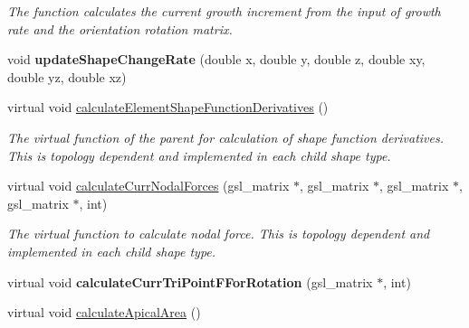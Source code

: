 \begin{DoxyCompactItemize}
\begin{DoxyCompactList}\small\item\em The function calculates the current growth increment from the input of growth rate and the orientation rotation matrix. \end{DoxyCompactList}\item 
\hypertarget{classShapeBase_a227d409b04d95e3110db851a9cb3ed8c}{}void {\bfseries update\+Shape\+Change\+Rate} (double x, double y, double z, double xy, double yz, double xz)\label{classShapeBase_a227d409b04d95e3110db851a9cb3ed8c}

\item 
\hypertarget{classShapeBase_ab86b6c4eef2ea6232dd1d0c300ae5602}{}virtual void \hyperlink{classShapeBase_ab86b6c4eef2ea6232dd1d0c300ae5602}{calculate\+Element\+Shape\+Function\+Derivatives} ()\label{classShapeBase_ab86b6c4eef2ea6232dd1d0c300ae5602}

\begin{DoxyCompactList}\small\item\em The virtual function of the parent for calculation of shape function derivatives. This is topology dependent and implemented in each child shape type. \end{DoxyCompactList}\item 
\hypertarget{classShapeBase_acca6ea9484bbc995d941f1a7bb25e1db}{}virtual void \hyperlink{classShapeBase_acca6ea9484bbc995d941f1a7bb25e1db}{calculate\+Curr\+Nodal\+Forces} (gsl\+\_\+matrix $\ast$, gsl\+\_\+matrix $\ast$, gsl\+\_\+matrix $\ast$, gsl\+\_\+matrix $\ast$, int)\label{classShapeBase_acca6ea9484bbc995d941f1a7bb25e1db}

\begin{DoxyCompactList}\small\item\em The virtual function to calculate nodal force. This is topology dependent and implemented in each child shape type. \end{DoxyCompactList}\item 
\hypertarget{classShapeBase_a9c1dc3dcba4b76026ce83fb7b78c0831}{}virtual void {\bfseries calculate\+Curr\+Tri\+Point\+F\+For\+Rotation} (gsl\+\_\+matrix $\ast$, int)\label{classShapeBase_a9c1dc3dcba4b76026ce83fb7b78c0831}

\item 
\hypertarget{classShapeBase_a010092ac7af5667facbbb8fb6bd98976}{}virtual void \hyperlink{classShapeBase_a010092ac7af5667facbbb8fb6bd98976}{calculate\+Apical\+Area} ()\label{classShapeBase_a010092ac7af5667facbbb8fb6bd98976}


\end{DoxyCompactItemize}
